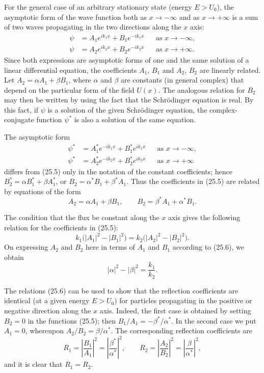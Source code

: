 For the general case of an arbitrary stationary state (energy $E>U_0$),
the asymptotic form of the wave function both as $x\to-\infty$ and as
$x\to+\infty$ is a sum of two waves propagating in the two directions along
the $x$ axis:
\begin{equation}
  \begin{aligned}
    \psi&=A_1e^{ik_1x}+B_1e^{-ik_1x} &&\text{as }x\to-\infty,\\
    \psi&=A_2e^{ik_2x}+B_2e^{-ik_2x} &&\text{as }x\to+\infty.
  \end{aligned}
  \tag{25.5}
\end{equation}
Since both expressions are asymptotic forms of one and the same solution of
a linear differential equation, the coefficients $A_1$, $B_1$ and $A_2$,
$B_2$ are linearly related. Let
$A_2=\alpha A_1+\beta B_1$, where $\alpha$ and $\beta$ are constants (in
general complex) that depend on the particular form of the field $U(x)$.
The analogous relation for $B_2$ may then be written by using the fact that
the Schrödinger equation is real. By this fact, if $\psi$ is a solution of
the given Schrödinger equation, the complex-conjugate function $\psi^*$ is
also a solution of the same equation.

The asymptotic form
\[
  \begin{aligned}
    \psi^*&=A_1^*e^{-ik_1x}+B_1^*e^{ik_1x} &&\text{as }x\to-\infty,\\
    \psi^*&=A_2^*e^{-ik_2x}+B_2^*e^{ik_2x} &&\text{as }x\to+\infty
  \end{aligned}
\]
differs from (25.5) only in the notation of the constant coefficients;
hence $B_2^*=\alpha B_1^*+\beta A_1^*$, or
$B_2=\alpha^*B_1+\beta^*A_1$. Thus the coefficients in (25.5) are related
by equations of the form
\begin{equation}
  A_2=\alpha A_1+\beta B_1,
  \qquad B_2=\beta^*A_1+\alpha^*B_1.
  \tag{25.6}
\end{equation}

The condition that the flux be constant along the $x$ axis gives the
following relation for the coefficients in (25.5):
\[
  k_1\bigl(|A_1|^2-|B_1|^2\bigr)
  =k_2\bigl(|A_2|^2-|B_2|^2\bigr).
\]
On expressing $A_2$ and $B_2$ here in terms of $A_1$ and $B_1$ according to
(25.6), we obtain
\begin{equation}
  |\alpha|^2-|\beta|^2=\frac{k_1}{k_2}.
  \tag{25.7}
\end{equation}

The relations (25.6) can be used to show that the reflection coefficients
are identical (at a given energy $E>U_0$) for particles propagating in the positive
or negative
direction along the $x$ axis. Indeed, the first case is obtained by setting
$B_2=0$ in the functions (25.5); then
$B_1/A_1=-\beta^*/\alpha^*$. In the second case we put $A_1=0$, whereupon
$A_2/B_2=\beta/\alpha^*$. The corresponding reflection coefficients are
\[
  R_1=\left|\frac{B_1}{A_1}\right|^2
  =\left|\frac{\beta^*}{\alpha^*}\right|^2,
  \qquad
  R_2=\left|\frac{A_2}{B_2}\right|^2
  =\left|\frac{\beta}{\alpha^*}\right|^2,
\]
and it is clear that $R_1=R_2$.


